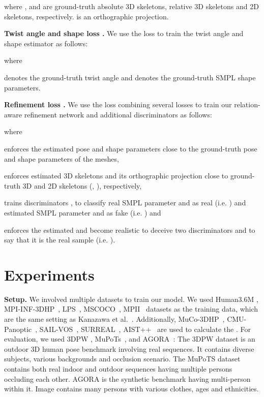 \documentclass[runningheads]{llncs}
\begin{document}
where ,  and  are ground-truth absolute 3D skeletons, relative 3D skeletons and 2D skeletons, respectively.  is an orthographic projection.

\noindent \textbf{Twist angle and shape loss .} We use the loss  to train the twist angle and shape estimator  as follows:

where

 denotes the ground-truth twist angle and  denotes the ground-truth SMPL shape parameters.

\noindent \textbf{Refinement loss .} We use the loss  combining several losses to train our relation-aware refinement network  and additional discriminators  as follows:

where

enforces the estimated pose  and shape  parameters close to the ground-truth pose  and shape  parameters of the meshes,

enforces estimated 3D skeletons  and its orthographic projection  close to ground-truth 3D and 2D skeletons (, ), respectively,

trains discriminators ,  to classify real SMPL parameter  and  as real (i.e. ) and estimated SMPL parameter  and  as fake (i.e. ) and 

enforces the estimated  and  become realistic to deceive two discriminators  and  to say that it is the real sample (i.e. ).

\section{Experiments}

\noindent \textbf{Setup.} We involved multiple datasets to train our model. We used Human3.6M \cite{ionescu2013human3}, MPI-INF-3DHP~\cite{mehta2017monocular}, LPS~\cite{johnson2010clustered}, MSCOCO~\cite{lin2014microsoft}, MPII~\cite{andriluka20142D} datasets as the training data, which are the same setting as Kanazawa et al.~\cite{kanazawa2018end}. Additionally, MuCo-3DHP~\cite{mehta2018single}, CMU-Panoptic~\cite{joo2015panoptic}, SAIL-VOS~\cite{hu2019sail}, SURREAL~\cite{varol2017learning}, AIST++~\cite{li2021learn} are used to calculate the . For evaluation, we used 3DPW \cite{von2018recovering}, MuPoTs~\cite{mehta2018single}, and AGORA~\cite{patel2021Agora}: The 3DPW dataset is an outdoor 3D human pose benchmark involving real sequences. It contains diverse subjects, various backgrounds and occlusion scenario. The MuPoTS dataset contains both real indoor and outdoor sequences having multiple persons occluding each other. AGORA is the synthetic benchmark having multi-person within it. Image contains many persons with various clothes, ages and ethnicities.
\end{document}

